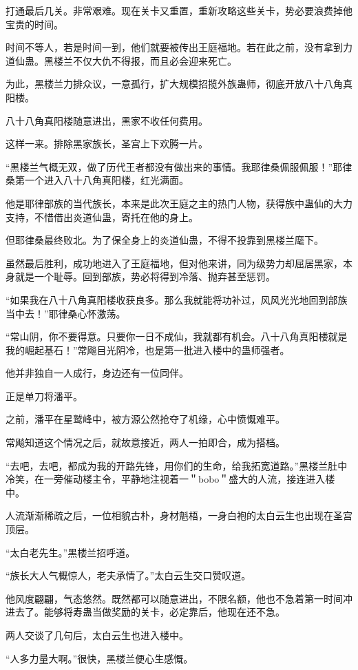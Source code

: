 \begin{this_body}
打通最后几关。非常艰难。现在关卡又重置，重新攻略这些关卡，势必要浪费掉他宝贵的时间。

时间不等人，若是时间一到，他们就要被传出王庭福地。若在此之前，没有拿到力道仙蛊。黑楼兰不仅大仇不得报，而且必会迎来死亡。

为此，黑楼兰力排众议，一意孤行，扩大规模招揽外族蛊师，彻底开放八十八角真阳楼。

八十八角真阳楼随意进出，黑家不收任何费用。

这样一来。排除黑家族长，圣宫上下欢腾一片。

“黑楼兰气概无双，做了历代王者都没有做出来的事情。我耶律桑佩服佩服！”耶律桑第一个进入八十八角真阳楼，红光满面。

他是耶律部族的当代族长，本来是此次王庭之主的热门人物，获得族中蛊仙的大力支持，不惜借出炎道仙蛊，寄托在他的身上。

但耶律桑最终败北。为了保全身上的炎道仙蛊，不得不投靠到黑楼兰麾下。

虽然最后胜利，成功地进入了王庭福地，但对他来讲，同为级势力却屈居黑家，本身就是一个耻辱。回到部族，势必将得到冷落、抛弃甚至惩罚。

“如果我在八十八角真阳楼收获良多。那么我就能将功补过，风风光光地回到部族当中去！”耶律桑心怀激荡。

“常山阴，你不要得意。只要你一日不成仙，我就都有机会。八十八角真阳楼就是我的崛起基石！”常飚目光阴冷，也是第一批进入楼中的蛊师强者。

他并非独自一人成行，身边还有一位同伴。

正是单刀将潘平。

之前，潘平在星鹫峰中，被方源公然抢夺了机缘，心中愤慨难平。

常飚知道这个情况之后，就故意接近，两人一拍即合，成为搭档。

“去吧，去吧，都成为我的开路先锋，用你们的生命，给我拓宽道路。”黑楼兰肚中冷笑，在一旁催动楼主令，平静地注视着一＂bobo＂盛大的人流，接连进入楼中。

人流渐渐稀疏之后，一位相貌古朴，身材魁梧，一身白袍的太白云生也出现在圣宫顶层。

“太白老先生。”黑楼兰招呼道。

“族长大人气概惊人，老夫承情了。”太白云生交口赞叹道。

他风度翩翩，气态悠然。既然都可以随意进出，不限名额，他也不急着第一时间冲进去了。能够将寿蛊当做奖励的关卡，必定靠后，他现在还不急。

两人交谈了几句后，太白云生也进入楼中。

“人多力量大啊。”很快，黑楼兰便心生感慨。


\end{this_body}
